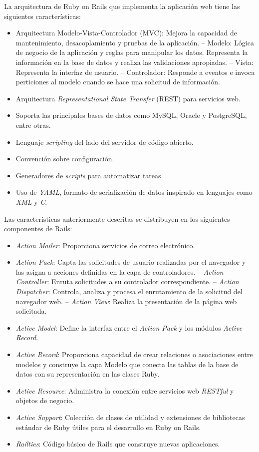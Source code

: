 La arquitectura de Ruby on Rails que implementa la aplicación web tiene las siguientes características:
\begin{itemize}
\item Arquitectura Modelo-Vista-Controlador (MVC): Mejora la capacidad de mantenimiento, desacoplamiento y pruebas de la aplicación.
\subitem-- Modelo: Lógica de negocio de la aplicación y reglas para manipular los datos. Representa la información en la base de datos y realiza las validaciones apropiadas.
\subitem-- Vista: Representa la interfaz de usuario.
\subitem-- Controlador: Responde a eventos e invoca perticiones al modelo cuando se hace una solicitud de información.
\item Arquitectura \textit{Representational State Transfer} (REST) para servicios web.
\item Soporta las principales bases de datos como MySQL, Oracle y PostgreSQL, entre otras.
\item Lenguaje \textit{scripting} del lado del servidor de código abierto.
\item Convención sobre configuración.
\item Generadores de \textit{scripts} para automatizar tareas.
\item Uso de \textit{YAML}, formato de serialización de datos inspirado en lenguajes como \textit{XML} y \textit{C}.
\end{itemize}

Las características anteriormente descritas se distribuyen en los siguientes componentes de Rails:
\begin{itemize}
\item \textit{Action Mailer}: Proporciona servicios de correo electrónico. 
\item \textit{Action Pack}: Capta las solicitudes de usuario realizadas por el navegador y las asigna a acciones definidas en la capa de controladores.
\subitem-- \textit{Action Controller}: Enruta solicitudes a su controlador correspondiente. 
\subitem-- \textit{Action Dispatcher}: Controla, analiza y procesa el enrutamiento de la solicitud del navegador web.
\subitem-- \textit{Action View}: Realiza la presentación de la página web solicitada.
\item \textit{Active Model}: Define la interfaz entre el \textit{Action Pack} y los módulos \textit{Active Record}.
\item \textit{Active Record}: Proporciona capacidad de crear relaciones o asociaciones entre modelos y construye la capa Modelo que conecta las tablas de la base de datos con su representación en las clases Ruby.
\item \textit{Active Resource}: Administra la conexión entre servicios web \textit{RESTful} y objetos de negocio.
\item \textit{Active Support}: Colección de clases de utilidad y extensiones de bibliotecas estándar de Ruby útiles para el desarrollo en Ruby on Rails.
\item \textit{Railties}: Código básico de Rails que construye nuevas aplicaciones. \end{itemize}	 


